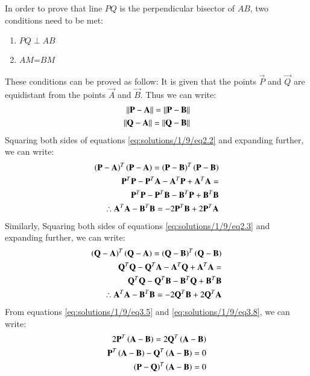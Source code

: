 \begin{figure}[h!]
\centering
\resizebox{\columnwidth}{!}
    {
    
    }
\end{figure}
In order to prove that line $PQ $ is the perpendicular bisector of $AB$, two conditions need to be met:
\begin{enumerate}
        \item $PQ \perp AB $
    \item $AM$=$BM$
\end{enumerate}
These conditions can be proved as follow:
\noindent It is given that the points $\vec{P}$ and $\vec{Q}$  are equidistant from the points $\vec{A}$ and $\vec{B}$. Thus we can write:
\begin{align}
    \left\lVert\mathbf{P}-\mathbf{A}\right\rVert=\left\lVert\mathbf{P}-\mathbf{B}\right\rVert \label{eq:solutions/1/9/eq2.2}\\
    \left\lVert\mathbf{Q}-\mathbf{A}\right\rVert=\left\lVert\mathbf{Q}-\mathbf{B}\right\rVert \label{eq:solutions/1/9/eq2.3}
\end{align}
Squaring both sides of equations \ref{eq:solutions/1/9/eq2.2} and expanding further, we can write:
\begin{align}
    \left(\mathbf{P}-\mathbf{A}\right)^T\left(\mathbf{P}-\mathbf{A}\right)=\left(\mathbf{P}-\mathbf{B}\right)^T\left(\mathbf{P}-\mathbf{B}\right) \\
    \mathbf{P}^T\mathbf{P}-\mathbf{P}^T\mathbf{A}-\mathbf{A}^T\mathbf{P}+\mathbf{A}^T\mathbf{A}= \nonumber \\ 
     \mathbf{P}^T\mathbf{P}-\mathbf{P}^T\mathbf{B}-\mathbf{B}^T\mathbf{P}+\mathbf{B}^T\mathbf{B} \\
     \therefore \mathbf{A}^T\mathbf{A}-\mathbf{B}^T\mathbf{B}=-2\mathbf{P}^T\mathbf{B}+2\mathbf{P}^T\mathbf{A}\label{eq:solutions/1/9/eq3.5}
\end{align}
Similarly, Squaring both sides of equations \ref{eq:solutions/1/9/eq2.3} and expanding further, we can write:
\begin{align}
    \left(\mathbf{Q}-\mathbf{A}\right)^T\left(\mathbf{Q}-\mathbf{A}\right)=\left(\mathbf{Q}-\mathbf{B}\right)^T\left(\mathbf{Q}-\mathbf{B}\right) \\
    \mathbf{Q}^T\mathbf{Q}-\mathbf{Q}^T\mathbf{A}-\mathbf{A}^T\mathbf{Q}+\mathbf{A}^T\mathbf{A}= \nonumber \\ 
     \mathbf{Q}^T\mathbf{Q}-\mathbf{Q}^T\mathbf{B}-\mathbf{B}^T\mathbf{Q}+\mathbf{B}^T\mathbf{B} \\
     \therefore \mathbf{A}^T\mathbf{A}-\mathbf{B}^T\mathbf{B}=-2\mathbf{Q}^T\mathbf{B}+2\mathbf{Q}^T\mathbf{A}\label{eq:solutions/1/9/eq3.8}
\end{align}
From equations \ref{eq:solutions/1/9/eq3.5} and \ref{eq:solutions/1/9/eq3.8}, we can write:
\begin{align}
    2\mathbf{P}^T\left(\mathbf{A}-\mathbf{B}\right)=2\mathbf{Q}^T\left(\mathbf{A}-\mathbf{B}\right)\\
    \mathbf{P}^T\left(\mathbf{A}-\mathbf{B}\right)-\mathbf{Q}^T\left(\mathbf{A}-\mathbf{B}\right)=0\\
    \left(\mathbf{P}-\mathbf{Q}\right)^T\left(\mathbf{A}-\mathbf{B}\right)=0
\end{align}

